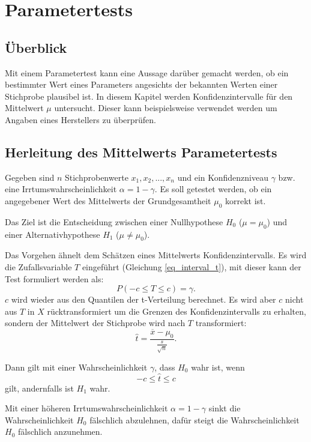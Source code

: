 \documentclass[10pt,twocolumn]{scrartcl}
\begin{document}
\section{Parametertests}
	\subsection{Überblick}
		Mit einem Parametertest kann eine Aussage darüber gemacht werden, ob ein bestimmter Wert eines Parameters angesichts der bekannten Werten einer Stichprobe plausibel ist. In diesem Kapitel werden Konfidenzintervalle für den Mittelwert $\mu$ untersucht. Dieser kann beispielsweise verwendet werden um Angaben eines Herstellers zu überprüfen.
	\subsection{Herleitung des Mittelwerts Parametertests}
		Gegeben sind $n$ Stichprobenwerte $x_1, x_2, ..., x_n$ und ein Konfidenzniveau $\gamma$ bzw. eine Irrtumswahrscheinlichkeit $\alpha = 1 - \gamma$. Es soll getestet werden, ob ein angegebener Wert des Mittelwerts der Grundgesamtheit $\mu_0$ korrekt ist.

		Das Ziel ist die Entscheidung zwischen einer Nullhypothese $H_0$ ($\mu = \mu_0$) und einer Alternativhypothese $H_1$ ($\mu \ne \mu_0$).

		Das Vorgehen ähnelt dem Schätzen eines Mittelwerts Konfidenzintervalls. Es wird die Zufallsvariable $T$ eingeführt (Gleichung \ref{eq_interval_t}), mit dieser kann der Test formuliert werden als:
		\begin{equation}
		P(-c \le T \le c) = \gamma .
		\end{equation}
		$c$ wird wieder aus den Quantilen der t-Verteilung berechnet. Es wird aber $c$ nicht aus $T$ in $X$ rücktransformiert um die Grenzen des Konfidenzintervalls zu erhalten, sondern der Mittelwert der Stichprobe wird nach $T$ transformiert:
		\begin{equation}
		\hat{t} = \frac{\overline{x} - \mu_0}{\frac{s}{\sqrt{n}}} .
		\end{equation}

		Dann gilt mit einer Wahrscheinlichkeit $\gamma$, dass $H_0$ wahr ist, wenn
		\begin{equation}
		-c \le \hat{t} \le c
		\end{equation}
		gilt, andernfalls ist $H_1$ wahr.

		Mit einer höheren Irrtumswahrscheinlichkeit $\alpha = 1 - \gamma$ sinkt die Wahrscheinlichkeit $H_0$ fälschlich abzulehnen, dafür steigt die Wahrscheinlichkeit $H_0$ fälschlich anzunehmen.
\end{document}
